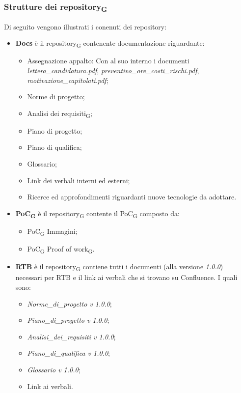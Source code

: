 \subsubsection{Strutture dei repository\textsubscript{G}}
Di seguito vengono illustrati i conenuti dei repository:
\begin{itemize}
	\item \textbf{Docs} è il repository\textsubscript{G} contenente documentazione riguardante:
	\begin{itemize}
		\item Assegnazione appalto: Con al suo interno i documenti \textit{lettera\_candidatura.pdf}, 
		\textit{preventivo\_ore\_costi\_rischi.pdf}, 
		\textit{motivazione\_capitolati.pdf};
		\item Norme di progetto;
		\item Analisi dei requisiti\textsubscript{G};
		\item Piano di progetto;
		\item Piano di qualifica;
		\item Glossario;
		\item Link dei verbali interni ed esterni;
		\item Ricerce ed approfondimenti riguardanti nuove tecnologie da adottare.
	\end{itemize}
	\item \textbf{PoC\textsubscript{G}} è il repository\textsubscript{G} contente il PoC\textsubscript{G} composto da:
	\begin{itemize}
		\item PoC\textsubscript{G} Immagini;
		\item PoC\textsubscript{G} Proof of work\textsubscript{G}.
	\end{itemize}
	\item \textbf{RTB} è il repository\textsubscript{G} contiene tutti i documenti (alla versione \textit{1.0.0}) necessari per RTB e il link ai verbali che si trovano su Confluence. I quali sono:
	\begin{itemize}
		\item \textit{Norme\_di\_progetto v 1.0.0};
		\item \textit{Piano\_di\_progetto v 1.0.0};
		\item \textit{Analisi\_dei\_requisiti v 1.0.0};
		\item \textit{Piano\_di\_qualifica v 1.0.0};
		\item \textit{Glossario v 1.0.0};
		\item Link ai verbali.
	\end{itemize}
\end{itemize}
